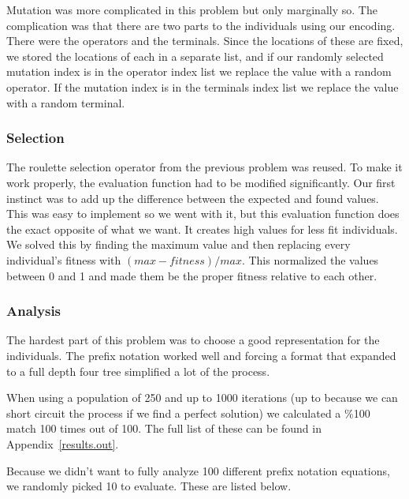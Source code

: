 Mutation was more complicated in this problem but only marginally so. The complication was that there are two parts to the individuals using our encoding. There were the operators and the terminals. Since the locations of these are fixed, we stored the locations of each in a separate list, and if our randomly selected mutation index is in the operator index list we replace the value with a random operator. If the mutation index is in the terminals index list we replace the value with a random terminal.

\subsubsection{Selection}
The roulette selection operator from the previous problem was reused. To make it work properly, the evaluation function had to be modified significantly. Our first instinct was to add up the difference between the expected and found values. This was easy to implement so we went with it, but this evaluation function does the exact opposite of what we want. It creates high values for less fit individuals. We solved this by finding the maximum value and then replacing every individual's fitness with $(max - fitness) / max$. This normalized the values between 0 and 1 and made them be the proper fitness relative to each other.

\subsubsection{Analysis}
The hardest part of this problem was to choose a good representation for the individuals. The prefix notation worked well and forcing a format that expanded to a full depth four tree simplified a lot of the process.

When using a population of 250 and up to 1000 iterations (up to because we can short circuit the process if we find a perfect solution) we calculated a \%100 match 100 times out of 100. The full list of these can be found in Appendix~\ref{results.out}.

Because we didn't want to fully analyze 100 different prefix notation equations, we randomly picked 10 to evaluate. These are listed below.

